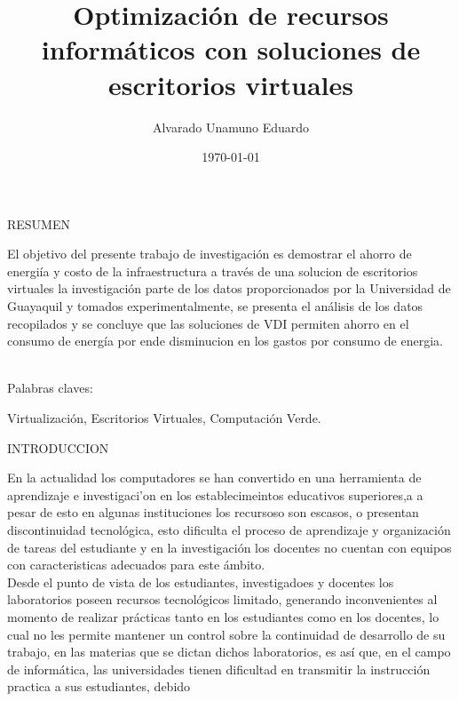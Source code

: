 \documentclass[a4paper,11pt]{article}
\begin{document}
\title{Optimizaci\'on de recursos inform\'aticos con soluciones de escritorios virtuales}
\author{Alvarado Unamuno Eduardo}
\date{\today}
\maketitle
\begin{bf}
\begin{center}
RESUMEN \\
\end{center}
\end{bf}
El objetivo del presente trabajo de investigaci\'on es demostrar 
el ahorro de energi\'ia y costo de la infraestructura a trav\'es 
de una solucion de escritorios virtuales la investigaci\'on parte de los datos proporcionados 
por la Universidad de Guayaquil y tomados experimentalmente, se presenta el an\'alisis de los 
datos recopilados y se concluye que las soluciones de VDI permiten ahorro en el consumo de energ\'ia
por ende disminucion en los gastos por consumo de energia.\\   
\\
\begin{bf}
Palabras claves:
\end{bf}
Virtualizaci\'on, Escritorios Virtuales, Computación Verde. \\
\begin{bf}
\begin{center}
INTRODUCCION\\
\end{center}
\end{bf}
En la actualidad los computadores se han convertido en una herramienta de 
aprendizaje e investigaci'on en los establecimeintos educativos superiores,a a pesar de esto
en algunas instituciones los recursoso son escasos, o presentan discontinuidad
tecnol\'ogica, esto dificulta el proceso de aprendizaje y organizaci\'on de
tareas del estudiante y en la investigaci\'on los docentes no cuentan con
equipos con caracteristicas adecuados para este \'ambito.\\
Desde el punto de vista de los estudiantes, investigadoes y docentes los laboratorios
poseen recursos tecnol\'ogicos limitado, generando inconvenientes al momento
de realizar pr\'acticas tanto en los estudiantes como en los docentes,
lo cual no les permite mantener un control sobre la continuidad de desarrollo de su trabajo,
en las materias que se dictan dichos laboratorios, es as\'i que, en el campo de informática, 
las universidades tienen dificultad en transmitir la instrucci\'on practica a sus estudiantes, debido
\end{document}
